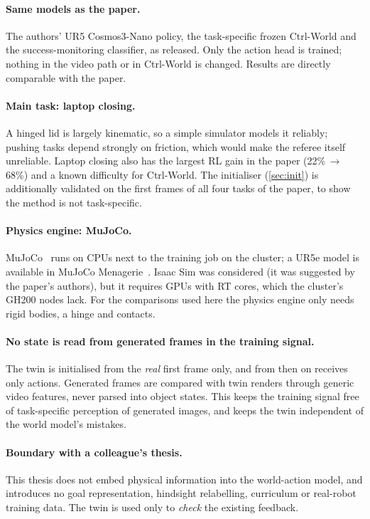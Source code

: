 \documentclass[11pt,a4paper]{article}
\theoremstyle{plain}
\theoremstyle{definition}
\theoremstyle{remark}
\begin{document}
\paragraph{Same models as the paper.} The authors' UR5 Cosmos3-Nano policy, the task-specific frozen Ctrl-World and the success-monitoring classifier, as released. Only the action head is trained; nothing in the video path or in Ctrl-World is changed. Results are directly comparable with the paper.

\paragraph{Main task: laptop closing.} A hinged lid is largely kinematic, so a simple simulator models it reliably; pushing tasks depend strongly on friction, which would make the referee itself unreliable. Laptop closing also has the largest RL gain in the paper (22\%$\,\to\,$68\%) and a known difficulty for Ctrl-World. The initialiser (\ref{sec:init}) is additionally validated on the first frames of all four tasks of the paper, to show the method is not task-specific.

\paragraph{Physics engine: MuJoCo.} MuJoCo~\cite{mujoco} runs on CPUs next to the training job on the cluster; a UR5e model is available in MuJoCo Menagerie~\cite{menagerie}. Isaac Sim was considered (it was suggested by the paper's authors), but it requires GPUs with RT cores, which the cluster's GH200 nodes lack. For the comparisons used here the physics engine only needs rigid bodies, a hinge and contacts.

\paragraph{No state is read from generated frames in the training signal.} The twin is initialised from the \emph{real} first frame only, and from then on receives only actions. Generated frames are compared with twin renders through generic video features, never parsed into object states. This keeps the training signal free of task-specific perception of generated images, and keeps the twin independent of the world model's mistakes.

\paragraph{Boundary with a colleague's thesis.} This thesis does not embed physical information into the world-action model, and introduces no goal representation, hindsight relabelling, curriculum or real-robot training data. The twin is used only to \emph{check} the existing feedback.
\end{document}
